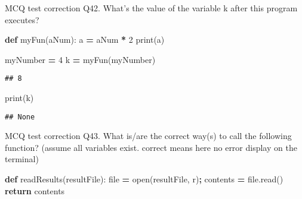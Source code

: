 \documentclass[
  8pt,
  ignorenonframetext,
]{beamer}
\newenvironment{Shaded}{\begin{snugshade}}{\end{snugshade}}
\newcommand{\BuiltInTok}[1]{#1}
\newcommand{\ControlFlowTok}[1]{\textcolor[rgb]{0.13,0.29,0.53}{\textbf{#1}}}
\newcommand{\DecValTok}[1]{\textcolor[rgb]{0.00,0.00,0.81}{#1}}
\newcommand{\KeywordTok}[1]{\textcolor[rgb]{0.13,0.29,0.53}{\textbf{#1}}}
\newcommand{\NormalTok}[1]{#1}
\newcommand{\OperatorTok}[1]{\textcolor[rgb]{0.81,0.36,0.00}{\textbf{#1}}}
\newcommand{\StringTok}[1]{\textcolor[rgb]{0.31,0.60,0.02}{#1}}
\begin{document}
\begin{frame}[fragile]{MCQ test correction}
\protect\hypertarget{mcq-test-correction-83}{}
Q42. What's the value of the variable k after this program executes?

\begin{Shaded}
\begin{Highlighting}[]
\KeywordTok{def}\NormalTok{ myFun(aNum):}
\NormalTok{    a }\OperatorTok{=}\NormalTok{ aNum }\OperatorTok{*} \DecValTok{2}
    \BuiltInTok{print}\NormalTok{(a)}

\NormalTok{myNumber }\OperatorTok{=} \DecValTok{4}
\NormalTok{k }\OperatorTok{=}\NormalTok{ myFun(myNumber)}
\end{Highlighting}
\end{Shaded}

\begin{verbatim}
## 8
\end{verbatim}

\begin{Shaded}
\begin{Highlighting}[]
\BuiltInTok{print}\NormalTok{(k)}
\end{Highlighting}
\end{Shaded}

\begin{verbatim}
## None
\end{verbatim}
\end{frame}

\begin{frame}[fragile]{MCQ test correction}
\protect\hypertarget{mcq-test-correction-84}{}
Q43. What is/are the correct way(s) to call the following function?
(assume all variables exist. correct means here no error display on the
terminal)

\begin{Shaded}
\begin{Highlighting}[]
\KeywordTok{def}\NormalTok{ readResults(resultFile):}
    \BuiltInTok{file} \OperatorTok{=} \BuiltInTok{open}\NormalTok{(resultFile, }\StringTok{\textquotesingle{}r\textquotesingle{}}\NormalTok{)}\OperatorTok{;}
\NormalTok{    contents }\OperatorTok{=} \BuiltInTok{file}\NormalTok{.read()}
    \ControlFlowTok{return}\NormalTok{ contents}
\end{Highlighting}
\end{Shaded}
\end{frame}
\end{document}
